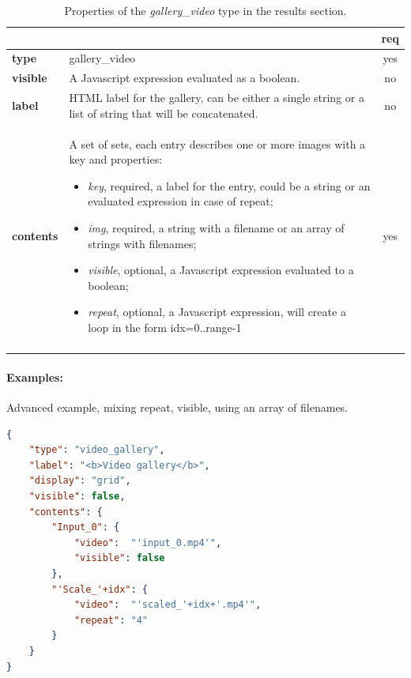 \begin{longtable}{|>{\bf}L{\linewidth}|L{\linewidth}|c|}
\hline
      &  & {\bf req} 
\tabularnewline \hline \hline
 type       & gallery\_video  & yes \\ \hline
 visible    & A Javascript expression evaluated as a boolean. & no \\ \hline
 label      & HTML label for the gallery, can be either a single string or 
             a list of string that will be concatenated. & no \\ \hline
 contents   & A set of sets, each entry describes one or more images with a key and properties:
\vspace{-1em}
\begin{itemize}
    \setlength\itemsep{-0.5em}
    \item \textit{key}, required, a label for the entry, could be a string or an evaluated expression in case of repeat;
    \item \textit{img}, required, a string with a filename or an array of strings with filenames;
    \item \textit{visible}, optional, a Javascript expression evaluated to a boolean;
    \item \textit{repeat}, optional, a Javascript expression, will create a loop in the form idx=0..range-1
\end{itemize} 
\vspace{-1em} & yes \\ \hline
\caption{Properties of the \emph{gallery\_video} type in the results section.}
\end{longtable}

\paragraph{Examples:}
Advanced example, mixing repeat, visible, using an array of filenames.
\begin{lstlisting}[language=json,firstnumber=1]
{
    "type": "video_gallery",
    "label": "<b>Video gallery</b>",
    "display": "grid",
    "visible": false,
    "contents": {
        "Input_0": {
            "video":  "'input_0.mp4'",
            "visible": false
        },
        "'Scale_'+idx": {
            "video":  "'scaled_'+idx+'.mp4'",
            "repeat": "4"
        }
    }
}
\end{lstlisting}



